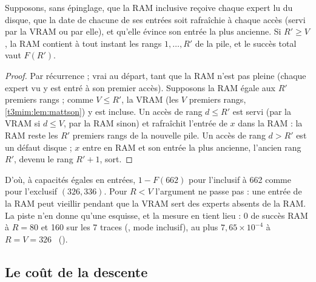\begin{proposition}\label{t3mim:prop:inclusif}
Supposons, sans épinglage, que la RAM inclusive reçoive chaque expert lu du disque, que la date de chacune de ses entrées soit rafraîchie à chaque accès (servi par la VRAM ou par elle), et qu'elle évince son entrée la plus ancienne. Si $R' \ge V$, la RAM contient à tout instant les rangs $1, \dots, R'$ de la pile, et le succès total vaut $F(R')$.
\end{proposition}
\begin{proof}
Par récurrence ; vrai au départ, tant que la RAM n'est pas pleine (chaque expert vu y est entré à son premier accès). Supposons la RAM égale aux $R'$ premiers rangs ; comme $V \le R'$, la VRAM (les $V$ premiers rangs, \cref{t3mim:lem:mattson}) y est incluse. Un accès de rang $d \le R'$ est servi (par la VRAM si $d \le V$, par la RAM sinon) et rafraîchit l'entrée de $x$ dans la RAM : la RAM reste les $R'$ premiers rangs de la nouvelle pile. Un accès de rang $d > R'$ est un défaut disque ; $x$ entre en RAM et son entrée la plus ancienne, l'ancien rang $R'$, devenu le rang $R'+1$, sort.
\end{proof}
D'où, à capacités égales en entrées, $1 - F(662)$ pour l'inclusif à 662 comme pour l'exclusif $(326, 336)$. Pour $R < V$ l'argument ne passe pas : une entrée de la RAM peut vieillir pendant que la VRAM sert des experts absents de la RAM. La piste n'en donne qu'une esquisse, et la mesure en tient lieu : 0 de succès RAM à $R = 80$ et 160 sur les 7 traces (, mode inclusif), au plus $7{,}65 \times 10^{-4}$ à $R = V = 326$ \mes~().

\subsection{Le coût de la descente}\label{t3mim:sec:p2-cout}

